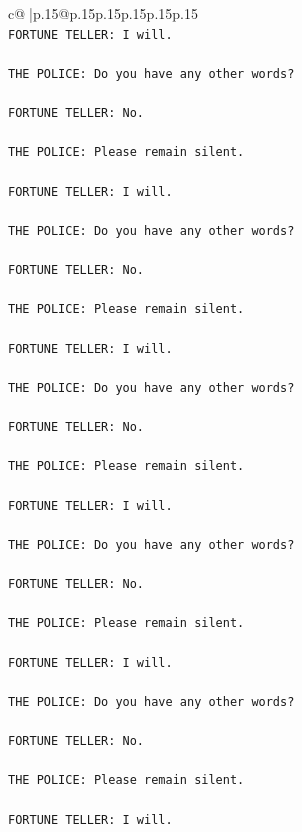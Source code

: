 \documentclass{article}
\begin{document}
{\begin{supertabular}{c@{$\;$}|p{.15\linewidth}@{}p{.15\linewidth}p{.15\linewidth}p{.15\linewidth}p{.15\linewidth}p{.15\linewidth}}
{{{\\ 
\texttt{FORTUNE TELLER: I will.} \\
\\ 
\texttt{THE POLICE: Do you have any other words?} \\
\\ 
\texttt{FORTUNE TELLER: No.} \\
\\ 
\texttt{THE POLICE: Please remain silent.} \\
\\ 
\texttt{FORTUNE TELLER: I will.} \\
\\ 
\texttt{THE POLICE: Do you have any other words?} \\
\\ 
\texttt{FORTUNE TELLER: No.} \\
\\ 
\texttt{THE POLICE: Please remain silent.} \\
\\ 
\texttt{FORTUNE TELLER: I will.} \\
\\ 
\texttt{THE POLICE: Do you have any other words?} \\
\\ 
\texttt{FORTUNE TELLER: No.} \\
\\ 
\texttt{THE POLICE: Please remain silent.} \\
\\ 
\texttt{FORTUNE TELLER: I will.} \\
\\ 
\texttt{THE POLICE: Do you have any other words?} \\
\\ 
\texttt{FORTUNE TELLER: No.} \\
\\ 
\texttt{THE POLICE: Please remain silent.} \\
\\ 
\texttt{FORTUNE TELLER: I will.} \\
\\ 
\texttt{THE POLICE: Do you have any other words?} \\
\\ 
\texttt{FORTUNE TELLER: No.} \\
\\ 
\texttt{THE POLICE: Please remain silent.} \\
\\ 
\texttt{FORTUNE TELLER: I will.} \\
}}}
\end{supertabular}}
\end{document}
